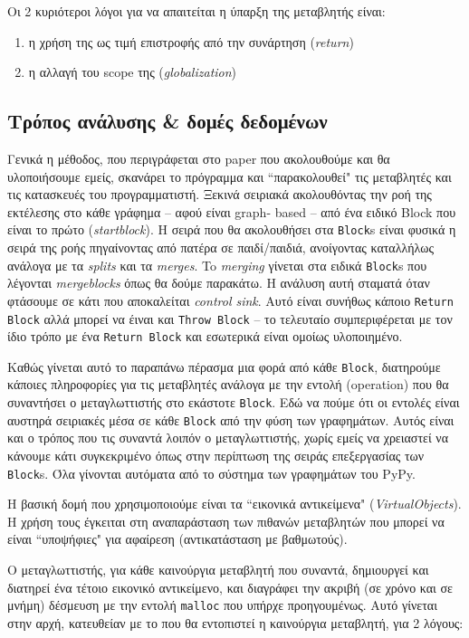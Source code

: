 Οι 2 κυριότεροι λόγοι για να απαιτείται η ύπαρξη της μεταβλητής είναι:
\begin{enumerate}
\item η χρήση της ως τιμή επιστροφής από την συνάρτηση (\textit{return})
\item η αλλαγή του scope της (\textit{globalization})
\end{enumerate} 

\subsection{Τρόπος ανάλυσης \& δομές δεδομένων}

Γενικά η μέθοδος, που περιγράφεται στο paper που ακολουθούμε
\cite{stadler2014partial} και θα υλοποιήσουμε εμείς, σκανάρει το πρόγραμμα και
``παρακολουθεί" τις μεταβλητές και τις κατασκευές του προγραμματιστή. Ξεκινά
σειριακά ακολουθόντας την ροή της εκτέλεσης στο κάθε γράφημα – αφού είναι graph-
based – από ένα ειδικό Block που είναι το πρώτο (\textit{startblock}). Η σειρά
που θα ακολουθήσει στα \texttt{Block}s είναι φυσικά η σειρά της ροής πηγαίνοντας
από πατέρα σε παιδί/παιδιά, ανοίγοντας καταλλήλως ανάλογα με τα \textit{splits}
και τα \textit{merges}. To \textit{merging} γίνεται στα ειδικά \texttt{Block}s
που λέγονται \textit{mergeblocks} όπως θα δούμε παρακάτω. Η ανάλυση αυτή σταματά
όταν φτάσουμε σε κάτι που αποκαλείται \textit{control sink}. Αυτό είναι συνήθως
κάποιο \texttt{Return Block} αλλά μπορεί να έιναι και \texttt{Throw Block} – το
τελευταίο συμπεριφέρεται με τον ίδιο τρόπο με ένα \texttt{Return Block} και
εσωτερικά είναι ομοίως υλοποιημένο.

Καθώς γίνεται αυτό το παραπάνω πέρασμα μια φορά από κάθε \texttt{Block},
διατηρούμε κάποιες πληροφορίες για τις μεταβλητές ανάλογα με την εντολή
(operation) που θα συναντήσει ο μεταγλωττιστής στο εκάστοτε \texttt{Block}. Εδώ
να πούμε ότι οι εντολές είναι αυστηρά σειριακές μέσα σε κάθε \texttt{Block} από
την φύση των γραφημάτων. Αυτός είναι και ο τρόπος που τις συναντά λοιπόν ο
μεταγλωττιστής, χωρίς εμείς να χρειαστεί να κάνουμε κάτι συγκεκριμένο όπως στην
περίπτωση της σειράς επεξεργασίας των \texttt{Block}s. Όλα γίνονται αυτόματα από
το σύστημα των γραφημάτων του PyPy.

Η βασική δομή που χρησιμοποιούμε είναι τα ``εικονικά αντικείμενα"
(\textit{VirtualObjects}). H χρήση τους έγκειται στη αναπαράσταση των πιθανών
μεταβλητών που μπορεί να είναι ``υποψήφιες" για αφαίρεση (αντικατάσταση με
βαθμωτούς).

Ο μεταγλωττιστής, για κάθε καινούργια μεταβλητή που συναντά, δημιουργεί και
διατηρεί ένα τέτοιο εικονικό αντικείμενο, και διαγράφει την ακριβή (σε χρόνο και
σε μνήμη) δέσμευση με την εντολή \texttt{malloc} που υπήρχε προηγουμένως. Αυτό
γίνεται στην αρχή, κατευθείαν με το που θα εντοπιστεί η καινούργια μεταβλητή,
για 2 λόγους:

